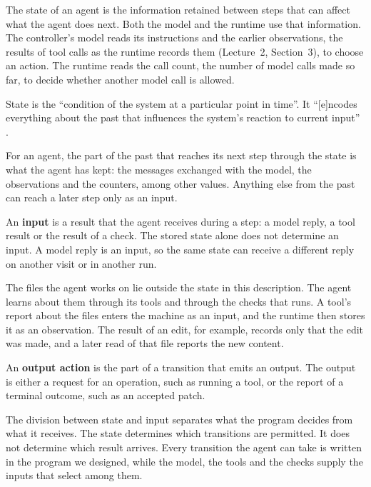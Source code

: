 The state of an agent is the information retained between steps that can affect what the agent does
next. Both the model and the runtime use that information. The controller's model reads its
instructions and the earlier observations, the results of tool calls as the runtime records them
(Lecture~2, Section~3), to choose an action. The runtime reads the call count, the number of model
calls made so far, to decide whether another model call is allowed.

\begin{definition}[State]
\label{def:machines-state}
State is the ``condition of the system at a particular point in time''. It ``[e]ncodes everything
about the past that influences the system's reaction to current input''
\citep[slide~10]{seshia2015discrete}.
\end{definition}

For an agent, the part of the past that reaches its next step through the state is what the agent
has kept: the messages exchanged with the model, the observations and the counters, among other
values. Anything else from the past can reach a later step only as an input.

An \textbf{input} is a result that the agent receives during a step: a model reply, a tool result
or the result of a check. The stored state alone does not determine an input. A model reply is an
input, so the same state can receive a different reply on another visit or in another run.

The files the agent works on lie outside the state in this description. The agent learns about them
through its tools and through the checks that  runs. A tool's report about the files
enters the machine as an input, and the runtime then stores it as an observation. The result of an
edit, for example, records only that the edit was made, and a later read of that file reports the
new content.

An \textbf{output action} is the part of a transition that emits an output. The output is either a
request for an operation, such as running a tool, or the report of a terminal outcome, such as an
accepted patch.

The division between state and input separates what the program decides from what it receives. The
state determines which transitions are permitted. It does not determine which result arrives. Every
transition the agent can take is written in the program we designed, while the model, the tools and
the checks supply the inputs that select among them.

